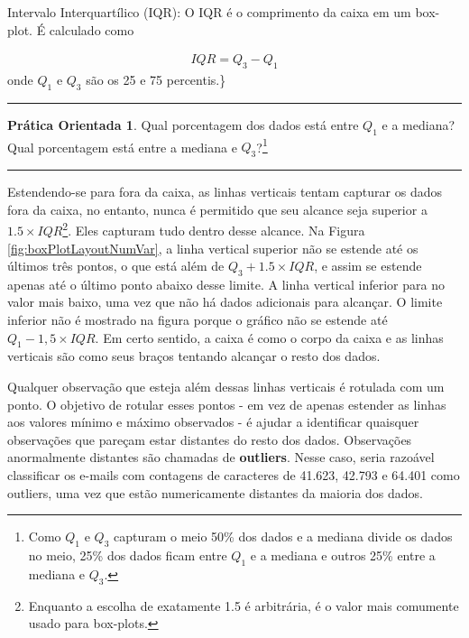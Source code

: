 \documentclass[
]{book}
\theoremstyle{definition}
\theoremstyle{definition}
\theoremstyle{definition}
\newtheorem{exercise}{Prática Orientada}[chapter]
\theoremstyle{definition}
\theoremstyle{remark}
\begin{document}
Intervalo Interquartílico (IQR): O IQR é o comprimento da caixa em um box-plot. É calculado como

\begin{eqnarray*}
IQR = Q_3 - Q_1
\end{eqnarray*}
onde \(Q_1\) e \(Q_3\) são os 25 e 75 percentis.\}

\begin{center}\rule{0.5\linewidth}{0.5pt}\end{center}

\begin{exercise}
\protect\hypertarget{exr:unnamed-chunk-27}{}{\label{exr:unnamed-chunk-27} }Qual porcentagem dos dados está entre \(Q_1\) e a mediana? Qual porcentagem está entre a mediana e \(Q_3\)?\footnote{Como \(Q_1\) e \(Q_3\) capturam o meio 50\% dos dados e a mediana divide os dados no meio, 25\% dos dados ficam entre \(Q_1\) e a mediana e outros 25\% entre a mediana e \(Q_3\).}
\end{exercise}

\begin{center}\rule{0.5\linewidth}{0.5pt}\end{center}

Estendendo-se para fora da caixa, as linhas verticais tentam capturar os dados fora da caixa, no entanto, nunca é permitido que seu alcance seja superior a \(1.5\times IQR\)\footnote{Enquanto a escolha de exatamente 1.5 é arbitrária, é o valor mais comumente usado para box-plots.}. Eles capturam tudo dentro desse alcance. Na Figura \ref{fig:boxPlotLayoutNumVar}, a linha vertical superior não se estende até os últimos três pontos, o que está além de \(Q_3 + 1.5\times IQR\), e assim se estende apenas até o último ponto abaixo desse limite. A linha vertical inferior para no valor mais baixo, uma vez que não há dados adicionais para alcançar. O limite inferior não é mostrado na figura porque o gráfico não se estende até \(Q_1 - 1,5\times IQR\). Em certo sentido, a caixa é como o corpo da caixa e as linhas verticais são como seus braços tentando alcançar o resto dos dados.

Qualquer observação que esteja além dessas linhas verticais é rotulada com um ponto. O objetivo de rotular esses pontos - em vez de apenas estender as linhas aos valores mínimo e máximo observados - é ajudar a identificar quaisquer observações que pareçam estar distantes do resto dos dados. Observações anormalmente distantes são chamadas de \textbf{outliers}. Nesse caso, seria razoável classificar os e-mails com contagens de caracteres de 41.623, 42.793 e 64.401 como outliers, uma vez que estão numericamente distantes da maioria dos dados.
\end{document}
